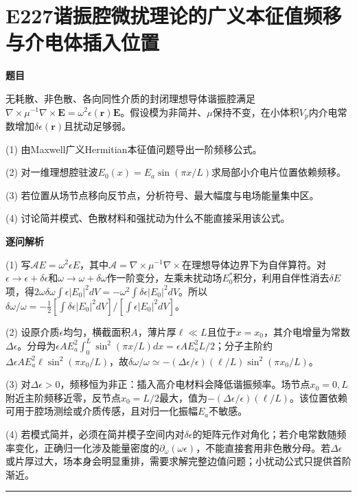 \documentclass[UTF8,a4paper,11pt,oneside,openany]{ctexbook}
\begin{document}
\section*{E227\quad 谐振腔微扰理论的广义本征值频移与介电体插入位置}
\textbf{题目}\par
无耗散、非色散、各向同性介质的封闭理想导体谐振腔满足$\nabla\times\mu^{-1}\nabla\times\boldsymbol E=\omega^2\epsilon(\boldsymbol r)\boldsymbol E$。假设模为非简并、$\mu$保持不变，在小体积$V_p$内介电常数增加$\delta\epsilon(\boldsymbol r)$且扰动足够弱。
\par\smallskip\noindent (1) 由Maxwell广义Hermitian本征值问题导出一阶频移公式。
\par\smallskip\noindent (2) 对一维理想腔驻波$E_0(x)=E_a\sin(\pi x/L)$求局部小介电片位置依赖频移。
\par\smallskip\noindent (3) 若位置从场节点移向反节点，分析符号、最大幅度与电场能量集中区。
\par\smallskip\noindent (4) 讨论简并模式、色散材料和强扰动为什么不能直接采用该公式。
\par\medskip\textbf{逐问解析}\par
\par\smallskip\noindent (1) 写$\mathcal A E=\omega^2\epsilon E$，其中$\mathcal A=\nabla\times\mu^{-1}\nabla\times$在理想导体边界下为自伴算符。对$\epsilon\to\epsilon+\delta\epsilon$和$\omega\to\omega+\delta\omega$作一阶变分，左乘未扰动场$E_0^*$积分，利用自伴性消去$\delta E$项，得$2\omega\delta\omega\int\epsilon|E_0|^2dV=-\omega^2\int\delta\epsilon|E_0|^2dV$。所以$\delta\omega/\omega=-\frac12[\int\delta\epsilon|E_0|^2dV]/[\int\epsilon|E_0|^2dV]$。
\par\smallskip\noindent (2) 设原介质$\epsilon$均匀，横截面积$A$，薄片厚$\ell\ll L$且位于$x=x_0$，其介电增量为常数$\Delta\epsilon$。分母为$\epsilon A E_a^2\int_0^L\sin^2(\pi x/L)dx=\epsilon A E_a^2L/2$；分子主阶约$\Delta\epsilon A E_a^2\ell\sin^2(\pi x_0/L)$，故$\delta\omega/\omega\simeq-(\Delta\epsilon/\epsilon)(\ell/L)\sin^2(\pi x_0/L)$。
\par\smallskip\noindent (3) 对$\Delta\epsilon>0$，频移恒为非正：插入高介电材料会降低谐振频率。场节点$x_0=0,L$附近主阶频移近零，反节点$x_0=L/2$最大，值为$-(\Delta\epsilon/\epsilon)(\ell/L)$。该位置依赖可用于腔场测绘或介质传感，且对归一化振幅$E_a$不敏感。
\par\smallskip\noindent (4) 若模式简并，必须在简并模子空间内对$\delta\epsilon$的矩阵元作对角化；若介电常数随频率变化，正确归一化涉及能量密度的$\partial_\omega(\omega\epsilon)$，不能直接套用非色散分母。若$\Delta\epsilon$或片厚过大，场本身会明显重排，需要求解完整边值问题；小扰动公式只提供首阶渐近。
\par\medskip\hrule\medskip
\end{document}
